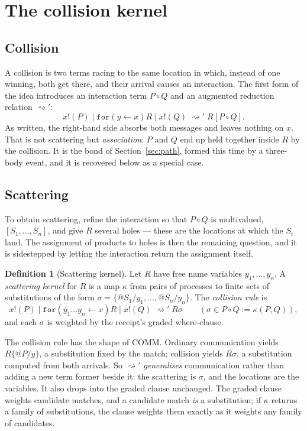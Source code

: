 \documentclass[11pt,a4paper]{article}
\theoremstyle{plain}
\theoremstyle{definition}
\newtheorem{definition}[theorem]{Definition}
\theoremstyle{remark}
\newcommand{\cred}{\rightsquigarrow'}
\newcommand{\coll}{\circ}
\newcommand{\code}[1]{\texttt{#1}}
\begin{document}
\section{The collision kernel}\label{sec:kernel}

\subsection{Collision}

A collision is two terms racing to the same location in which, instead of one
winning, both get there, and their arrival causes an interaction. The first
form of the idea introduces an interaction term $P\coll Q$ and an augmented
reduction relation $\cred$:
\[
x!(P) \mid \code{for}(y\leftarrow x)R \mid x!(Q) \;\cred\; R[P\coll Q].
\]
As written, the right-hand side absorbs both messages and leaves nothing on
$x$. That is not scattering but \emph{association}: $P$ and $Q$ end up held
together inside $R$ by the collision. It is the bond of
Section~\ref{sec:path}, formed this time by a three-body event, and it is
recovered below as a special case.

\subsection{Scattering}

To obtain scattering, refine the interaction so that $P\coll Q$ is
multivalued, $[S_1,\dots,S_n]$, and give $R$ several holes --- these are the
locations at which the $S_i$ land. The assignment of products to holes is then
the remaining question, and it is sidestepped by letting the interaction
return the assignment itself.

\begin{definition}[Scattering kernel]\label{def:kernel}
Let $R$ have free name variables $y_1,\dots,y_n$. A \emph{scattering kernel}
for $R$ is a map $\kappa$ from pairs of processes to finite sets of
substitutions of the form $\sigma = \{@S_1/y_1,\dots,@S_n/y_n\}$. The
\emph{collision rule} is
\[
x!(P) \mid \code{for}(y_1\dots y_n \leftarrow x)R \mid x!(Q)
\;\cred\; R\sigma
\qquad (\sigma\in P\coll Q := \kappa(P,Q)),
\]
and each $\sigma$ is weighted by the receipt's graded where-clause.
\end{definition}

The collision rule has the shape of COMM. Ordinary communication yields
$R\{@P/y\}$, a substitution fixed by the match; collision yields $R\sigma$, a
substitution computed from both arrivals. So $\cred$ \emph{generalises}
communication rather than adding a new term former beside it: the scattering
is $\sigma$, and the locations are the variables. It also drops into the
graded clause unchanged. The graded clause weights candidate matches, and a
candidate match \emph{is} a substitution; if $\kappa$ returns a family of
substitutions, the clause weights them exactly as it weights any family of
candidates.
\end{document}
